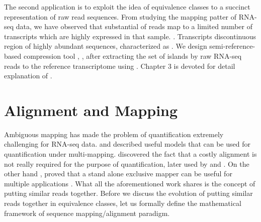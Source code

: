 The second application  is to exploit the idea of equivalence classes to  a succinct representation of raw read sequences. From studying the mapping patter of RNA-seq data, we have observed that  substantial  of reads map to a limited number of transcripts which are highly expressed in that sample. . Transcripts  discontinuous region of highly abundant sequences, characterized as \islands. We design  semi-reference-based compression tool , \quark, after extracting the set of islands by  raw RNA-seq reads to the reference transcriptome using \rapmap. Chapter 3 is devoted for detail explanation of \quark. 







\section{Alignment and Mapping}
Ambiguous mapping has made the problem of quantification extremely challenging for RNA-seq data. \citet{salzman2011statistical} and \citet{pachter2011models} described useful models that can be used for quantification under multi-mapping. \citet{sailfish} discovered the fact that a costly alignment is not really required for the purpose of quantification,  later used by \citet{kallisto} and \citet{salmon}. On the other hand \citet{rapmap},  proved that a stand alone exclusive mapper can be useful for multiple applications . What all the aforementioned work shares is the concept of putting similar reads together. Before we discuss the evolution of putting similar reads together in equivalence classes, let us formally define the mathematical framework of  sequence mapping/alignment paradigm. 

